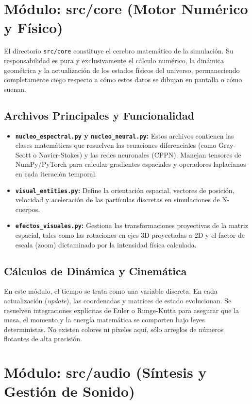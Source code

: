 \documentclass[12pt]{book}
\begin{document}
\section{Módulo: src/core (Motor Numérico y Físico)}

El directorio \texttt{src/core} constituye el cerebro matemático de la simulación. Su responsabilidad es pura y exclusivamente el cálculo numérico, la dinámica geométrica y la actualización de los estados físicos del universo, permaneciendo completamente ciego respecto a cómo estos datos se dibujan en pantalla o cómo suenan.

\subsection{Archivos Principales y Funcionalidad}
\begin{itemize}
    \item \textbf{\texttt{nucleo\_espectral.py} y \textbf{\texttt{nucleo\_neural.py}}:} Estos archivos contienen las clases matemáticas que resuelven las ecuaciones diferenciales (como Gray-Scott o Navier-Stokes) y las redes neuronales (CPPN). Manejan tensores de NumPy/PyTorch para calcular gradientes espaciales y operadores laplacianos en cada iteración temporal.
    \item \textbf{\texttt{visual\_entities.py}:} Define la orientación espacial, vectores de posición, velocidad y aceleración de las partículas discretas en simulaciones de N-cuerpos. 
    \item \textbf{\texttt{efectos\_visuales.py}:} Gestiona las transformaciones proyectivas de la matriz espacial, tales como las rotaciones en ejes 3D proyectadas a 2D y el factor de escala (zoom) dictaminado por la intensidad física calculada.
\end{itemize}

\subsection{Cálculos de Dinámica y Cinemática}
En este módulo, el tiempo se trata como una variable discreta. En cada actualización (\textit{update}), las coordenadas y matrices de estado evolucionan. Se resuelven integraciones explícitas de Euler o Runge-Kutta para asegurar que la masa, el momento y la energía matemática se comporten bajo leyes deterministas. No existen colores ni píxeles aquí, sólo arreglos de números flotantes de alta precisión.

\section{Módulo: src/audio (Síntesis y Gestión de Sonido)}
\end{document}
